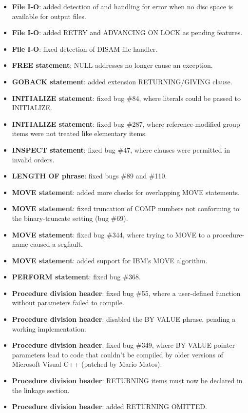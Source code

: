 \begin{itemize}
\item \textbf{File I-O}: added detection of and handling for error when no disc space is available for output files.
\item \textbf{File I-O}: added RETRY and ADVANCING ON LOCK as pending features.
\item \textbf{File I-O}: fixed detection of DISAM file handler.
\item \textbf{FREE statement}: NULL addresses no longer cause an exception.
\item \textbf{GOBACK statement}: added extension RETURNING\slash{}GIVING clause.
\item \textbf{INITIALIZE statement}: fixed bug \#84, where literals could be passed to INITIALIZE.
\item \textbf{INITIALIZE statement}: fixed bug \#287, where reference-modified group items were not treated like elementary items.
\item \textbf{INSPECT statement}: fixed bug \#47, where clauses were permitted in invalid orders.
\item \textbf{LENGTH OF phrase}: fixed bugs \#89 and \#110.
\item \textbf{MOVE statement}: added more checks for overlapping MOVE statements.
\item \textbf{MOVE statement}: fixed truncation of COMP numbers not conforming to the binary-truncate setting (bug \#69).
\item \textbf{MOVE statement}: fixed bug \#344, where trying to MOVE to a procedure-name caused a segfault.
\item \textbf{MOVE statement}: added support for IBM's MOVE algorithm.
\item \textbf{PERFORM statement}: fixed bug \#368.
\item \textbf{Procedure division header}: fixed bug \#55, where a user-defined function without parameters failed to compile.
\item \textbf{Procedure division header}: disabled the BY VALUE phrase, pending a working implementation.
\item \textbf{Procedure division header}: fixed bug \#349, where BY VALUE pointer parameters lead to code that couldn't be compiled by older versions of Microsoft Visual C++ (patched by Mario Matos).
\item \textbf{Procedure division header}: RETURNING items must now be declared in the linkage section.
\item \textbf{Procedure division header}: added RETURNING OMITTED.

\end{itemize}
